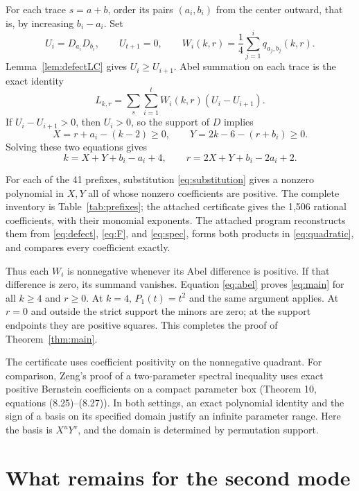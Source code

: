 \documentclass[11pt]{article}
\begin{document}
For each trace $s=a+b$, order its pairs $(a_i,b_i)$ from the center
outward, that is, by increasing $b_i-a_i$. Set
\[
U_i=D_{a_i}D_{b_i},\qquad U_{t+1}=0,\qquad
W_i(k,r)=\frac14\sum_{j=1}^i q_{a_j,b_j}(k,r).
\]
Lemma~\ref{lem:defectLC} gives $U_i\geq U_{i+1}$. Abel summation on
each trace is the exact identity
\begin{equation}\label{eq:abel}
L_{k,r}=\sum_s\sum_{i=1}^t W_i(k,r)(U_i-U_{i+1}).
\end{equation}
If $U_i-U_{i+1}>0$, then $U_i>0$, so the support of $D$ implies
\[
X=r+a_i-(k-2)\geq0,\qquad
Y=2k-6-(r+b_i)\geq0.
\]
Solving these two equations gives
\begin{equation}\label{eq:substitution}
k=X+Y+b_i-a_i+4,\qquad r=2X+Y+b_i-2a_i+2.
\end{equation}

For each of the 41 prefixes, substitution \eqref{eq:substitution}
gives a nonzero polynomial in $X,Y$ all of whose nonzero coefficients
are positive. The complete inventory is Table~\ref{tab:prefixes}; the
attached certificate gives the 1,506 rational coefficients, with their
monomial exponents. The attached program reconstructs them from
\eqref{eq:defect}, \eqref{eq:F}, and \eqref{eq:spec}, forms both products
in \eqref{eq:quadratic}, and compares every coefficient exactly.

Thus each $W_i$ is nonnegative whenever its Abel difference is positive.
If that difference is zero, its summand vanishes. Equation
\eqref{eq:abel} proves \eqref{eq:main} for all $k\geq4$ and $r\geq0$.
At $k=4$, $P_1(t)=t^2$ and the same argument applies. At $r=0$ and
outside the strict support the minors are zero; at the support endpoints
they are positive squares. This completes the proof of
Theorem~\ref{thm:main}.

The certificate uses coefficient positivity on the nonnegative quadrant.
For comparison, Zeng's proof of a two-parameter spectral inequality uses exact
positive Bernstein coefficients on a compact parameter box \cite{Zeng2026Lens}
(Theorem 10, equations (8.25)--(8.27)). In both
settings, an exact polynomial identity and the sign of a basis on its
specified domain justify an infinite parameter range. Here the basis
is $X^uY^v$, and the domain is determined by permutation support.

\section{What remains for the second mode}
\end{document}
